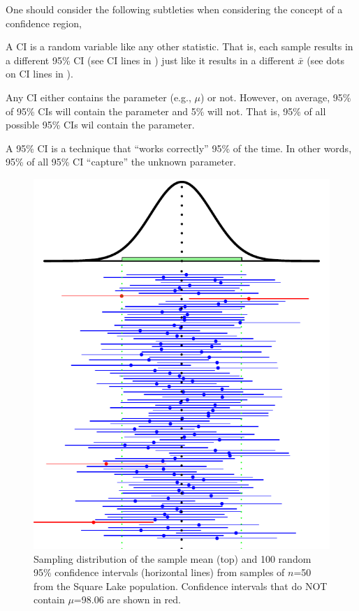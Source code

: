 \documentclass[10pt,openany]{book}\usepackage[]{graphicx}\usepackage[]{color}
\newenvironment{knitrout}{}{} %
\begin{document}

One should consider the following subtleties when considering the concept of a confidence region,
\vspace{-6pt}
\begin{Itemize}
  \item A CI is a random variable like any other statistic. That is, each sample results in a different 95\% CI (see CI lines in ) just like it results in a different $\bar{x}$ (see dots on CI lines in ).
  \item Any CI either contains the parameter (e.g., $\mu$) or not.  However, on average, 95\% of 95\% CIs will contain the parameter and 5\% will not.  That is, 95\% of all possible 95\% CIs wil contain the parameter.
  \item A 95\% CI is a technique that ``works correctly'' 95\% of the time.  In other words, 95\% of all 95\% CI ``capture'' the unknown parameter.
\end{Itemize}

\begin{knitrout}
\color{fgcolor}\begin{figure}[hbtp]

{\centering \includegraphics[width=.6\linewidth]{Figs/CIex100-1} 

}

\caption[Sampling distribution of the sample mean (top) and 100 random 95\% confidence intervals (horizontal lines) from samples of $n$=50 from the Square Lake population]{Sampling distribution of the sample mean (top) and 100 random 95\% confidence intervals (horizontal lines) from samples of $n$=50 from the Square Lake population.  Confidence intervals that do NOT contain $\mu$=98.06 are shown in red.}\label{fig:CIex100}
\end{figure}


\end{knitrout}
\end{document}
